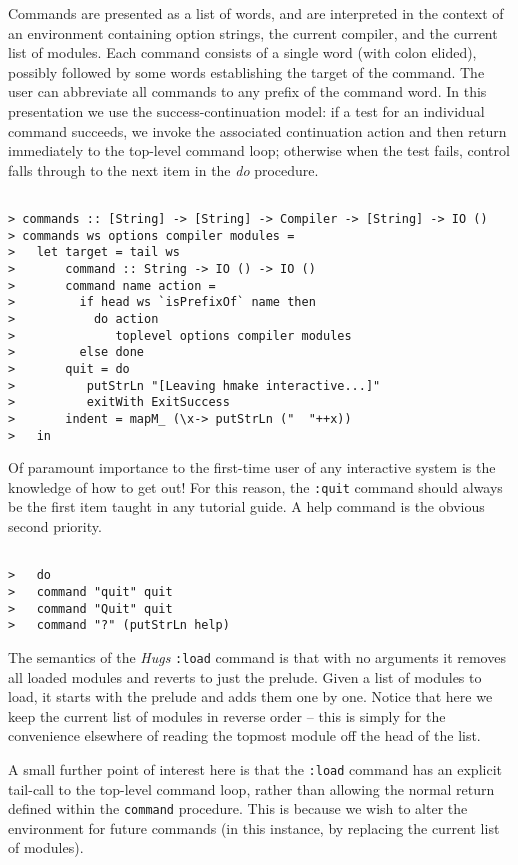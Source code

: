 \documentclass[a4paper]{article}
\begin{document}
Commands are presented as a list of words, and are interpreted in the
context of an environment containing option strings, the current
compiler, and the current list of modules.  Each command consists of
a single word (with colon elided), possibly followed by some words
establishing the target of the command.  The user can abbreviate all
commands to any prefix of the command word.  In this presentation we
use the success-continuation model: if a test for an individual
command succeeds, we invoke the associated continuation action and
then return immediately to the top-level command loop; otherwise when
the test fails, control falls through to the next item in the {\em
do} procedure.

\begin{verbatim}

> commands :: [String] -> [String] -> Compiler -> [String] -> IO ()
> commands ws options compiler modules =
>   let target = tail ws 
>       command :: String -> IO () -> IO ()
>       command name action =
>         if head ws `isPrefixOf` name then
>           do action
>              toplevel options compiler modules
>         else done
>       quit = do
>          putStrLn "[Leaving hmake interactive...]"
>          exitWith ExitSuccess
>       indent = mapM_ (\x-> putStrLn ("  "++x))
>   in

\end{verbatim}

Of paramount importance to the first-time user of any interactive system
is the knowledge of how to get out!  For this reason, the {\tt :quit}
command should always be the first item taught in any tutorial guide.
A help command is the obvious second priority.

\begin{verbatim}

>   do
>   command "quit" quit
>   command "Quit" quit
>   command "?" (putStrLn help)

\end{verbatim}

The semantics of the {\em Hugs} {\tt :load} command is that with
no arguments it removes all loaded modules and reverts to just the
prelude.  Given a list of modules to load, it starts with the prelude
and adds them one by one.  Notice that here we keep the current list
of modules in reverse order -- this is simply for the convenience
elsewhere of reading the topmost module off the head of the list.

A small further point of interest here is that the {\tt :load} command
has an explicit tail-call to the top-level command loop, rather than
allowing the normal return defined within the {\tt command} procedure.
This is because we wish to alter the environment for future commands
(in this instance, by replacing the current list of modules).
\end{document}
